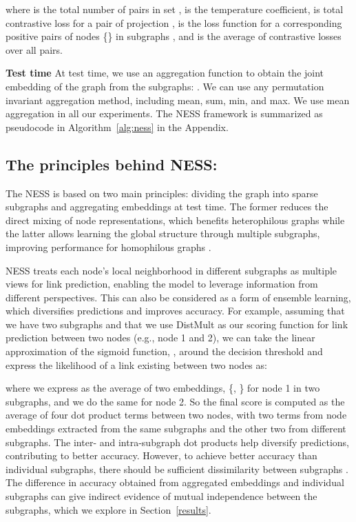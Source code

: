 \documentclass{article}
\begin{document}
 
where  is the total number of pairs in set ,  is the temperature coefficient,  is total contrastive loss for a pair of projection ,  is the loss function for a corresponding positive pairs of nodes \{\} in subgraphs , and  is the average of contrastive losses over all pairs. 

\textbf{Test time}
At test time, we use an aggregation function to obtain the joint embedding of the graph  from the subgraphs: . We can use any permutation invariant aggregation method, including mean, sum, min, and max. We use mean aggregation in all our experiments. The NESS framework is summarized as pseudocode in Algorithm~\ref{alg:ness} in the Appendix.

\subsection{The principles behind NESS:}\label{ness_principles}
The NESS is based on two main principles: dividing the graph into sparse subgraphs and aggregating embeddings at test time. The former reduces the direct mixing of node representations, which benefits heterophilous graphs while the latter allows learning the global structure through multiple subgraphs, improving performance for homophilous graphs \citep{zhu2020beyond}.


NESS treats each node's local neighborhood in different subgraphs as multiple views for link prediction, enabling the model to leverage information from different perspectives. This can also be considered as a form of ensemble learning, which diversifies predictions and improves accuracy. For example, assuming that we have two subgraphs and that we use DistMult \citep{yang2014embedding} as our scoring function for link prediction between two nodes (e.g., node 1 and 2), we can take the linear approximation of the sigmoid function, , around the decision threshold  and express the likelihood of a link existing between two nodes as:

where we express  as the average of two embeddings, \{, \} for node 1 in two subgraphs, and we do the same for node 2. So the final score is computed as the average of four dot product terms between two nodes, with two terms from node embeddings extracted from the same subgraphs and the other two from different subgraphs. The inter- and intra-subgraph dot products help diversify predictions, contributing to better accuracy. However, to achieve better accuracy than individual subgraphs, there should be sufficient dissimilarity between subgraphs \citep{ho1998random}. The difference in accuracy obtained from aggregated embeddings and individual subgraphs can give indirect evidence of mutual independence between the subgraphs, which we explore in Section~\ref{results}.
\end{document}
